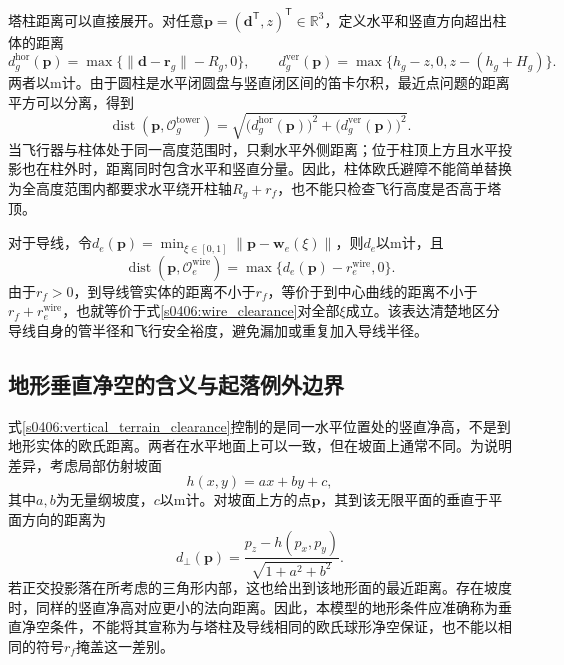塔柱距离可以直接展开。对任意$\mathbf p=(\mathbf d^{\mathsf T},z)^{\mathsf T}\in\mathbb R^3$，定义水平和竖直方向超出柱体的距离
\begin{equation}
 d_g^{\mathrm{hor}}(\mathbf p)
 =\max\{\|\mathbf d-\mathbf r_g\|-R_g,0\},
 \qquad
 d_g^{\mathrm{ver}}(\mathbf p)
 =\max\{h_g-z,0,z-(h_g+H_g)\}.
 \label{s0406:cylinder_distance_components}
\end{equation}
两者以$\mathrm m$计。由于圆柱是水平闭圆盘与竖直闭区间的笛卡尔积，最近点问题的距离平方可以分离，得到
\begin{equation}
 \operatorname{dist}(\mathbf p,\mathcal O_g^{\mathrm{tower}})
 =\sqrt{\bigl(d_g^{\mathrm{hor}}(\mathbf p)\bigr)^2
       +\bigl(d_g^{\mathrm{ver}}(\mathbf p)\bigr)^2}.
 \label{s0406:cylinder_euclidean_distance}
\end{equation}
当飞行器与柱体处于同一高度范围时，只剩水平外侧距离；位于柱顶上方且水平投影也在柱外时，距离同时包含水平和竖直分量。因此，柱体欧氏避障不能简单替换为全高度范围内都要求水平绕开柱轴$R_g+r_f$，也不能只检查飞行高度是否高于塔顶。

对于导线，令$d_e(\mathbf p)=\min_{\xi\in[0,1]}\|\mathbf p-\mathbf w_e(\xi)\|$，则$d_e$以$\mathrm m$计，且
\begin{equation}
 \operatorname{dist}(\mathbf p,\mathcal O_e^{\mathrm{wire}})
 =\max\{d_e(\mathbf p)-r_e^{\mathrm{wire}},0\}.
 \label{s0406:wire_tube_distance}
\end{equation}
由于$r_f>0$，到导线管实体的距离不小于$r_f$，等价于到中心曲线的距离不小于$r_f+r_e^{\mathrm{wire}}$，也就等价于式\eqref{s0406:wire_clearance}对全部$\xi$成立。该表达清楚地区分导线自身的管半径和飞行安全裕度，避免漏加或重复加入导线半径。

\subsection{地形垂直净空的含义与起落例外边界}

式\eqref{s0406:vertical_terrain_clearance}控制的是同一水平位置处的竖直净高，不是到地形实体的欧氏距离。两者在水平地面上可以一致，但在坡面上通常不同。为说明差异，考虑局部仿射坡面
\begin{equation}
 h(x,y)=a x+b y+c,
 \label{s0406:planar_slope}
\end{equation}
其中$a,b$为无量纲坡度，$c$以$\mathrm m$计。对坡面上方的点$\mathbf p$，其到该无限平面的垂直于平面方向的距离为
\begin{equation}
 d_{\perp}(\mathbf p)
 =\frac{p_z-h(p_x,p_y)}{\sqrt{1+a^2+b^2}}.
 \label{s0406:slope_normal_distance}
\end{equation}
若正交投影落在所考虑的三角形内部，这也给出到该地形面的最近距离。存在坡度时，同样的竖直净高对应更小的法向距离。因此，本模型的地形条件应准确称为垂直净空条件，不能将其宣称为与塔柱及导线相同的欧氏球形净空保证，也不能以相同的符号$r_f$掩盖这一差别。

